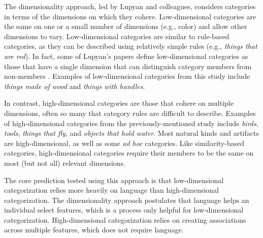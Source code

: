 \documentclass[../dissertation.tex]{subfiles}
\begin{document}
The dimensionality approach, led by Lupyan and colleagues, considers categories in terms of the dimensions on which they cohere. Low-dimensional categories are the same on one or a small number of dimensions (e.g., color) and allow other dimensions to vary. Low-dimensional categories are similar to rule-based categories, as they can be described using relatively simple rules (e.g., \textit{things that are red}). In fact, some of Lupyan's papers define low-dimensional categories as those that have a single dimension that can distinguish category members from non-members \citep{Lupyan2013}. Examples of low-dimensional categories from this study include \textit{things made of wood} and \textit{things with handles}. \par
	In contrast, high-dimensional categories are those that cohere on multiple dimensions, often so many that category rules are difficult to describe. Examples of high-dimensional categories from the previously-mentioned study include \textit{birds}, \textit{tools}, \textit{things that fly}, and \textit{objects that hold water}. Most natural kinds and artifacts are high-dimensional, as well as some \textit{ad hoc} categories. Like similarity-based categories, high-dimensional categories require their members to be the same on most (but not all) relevant dimensions. \par
	The core prediction tested using this approach is that low-dimensional categorization relies more heavily on language than high-dimensional categorization. The dimensionality approach postulates that language helps an individual select features, which is a process only helpful for low-dimensional categorization. High-dimensional categorization relies on creating associations across multiple features, which does not require language. \par 
\end{document}
